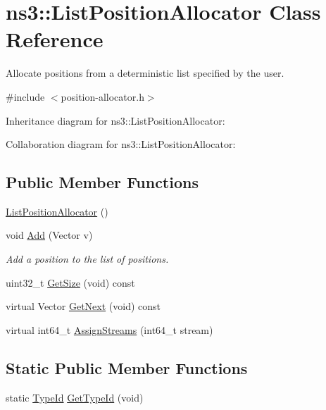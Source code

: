 \hypertarget{classns3_1_1ListPositionAllocator}{}\section{ns3\+:\+:List\+Position\+Allocator Class Reference}
\label{classns3_1_1ListPositionAllocator}


Allocate positions from a deterministic list specified by the user.  




{\ttfamily \#include $<$position-\/allocator.\+h$>$}



Inheritance diagram for ns3\+:\+:List\+Position\+Allocator\+:


Collaboration diagram for ns3\+:\+:List\+Position\+Allocator\+:
\subsection*{Public Member Functions}
\begin{DoxyCompactItemize}
\item 
\hyperlink{classns3_1_1ListPositionAllocator_a4f44f9dbdc88a64afe69e166965e191f}{List\+Position\+Allocator} ()
\item 
void \hyperlink{classns3_1_1ListPositionAllocator_a460e82f015ac012a73ba0ea0cccb3486}{Add} (Vector v)
\begin{DoxyCompactList}\small\item\em Add a position to the list of positions. \end{DoxyCompactList}\item 
uint32\+\_\+t \hyperlink{classns3_1_1ListPositionAllocator_aba32720727514405b081f17231765977}{Get\+Size} (void) const 
\item 
virtual Vector \hyperlink{classns3_1_1ListPositionAllocator_a39c1db898ea6db91c3bed8adf73f02b4}{Get\+Next} (void) const 
\item 
virtual int64\+\_\+t \hyperlink{classns3_1_1ListPositionAllocator_aef52f0c309c98104a40e02957512a469}{Assign\+Streams} (int64\+\_\+t stream)
\end{DoxyCompactItemize}
\subsection*{Static Public Member Functions}
\begin{DoxyCompactItemize}
\item 
static \hyperlink{classns3_1_1TypeId}{Type\+Id} \hyperlink{classns3_1_1ListPositionAllocator_abdce17477a795df60fc488a6fd23145a}{Get\+Type\+Id} (void)
\end{DoxyCompactItemize}
